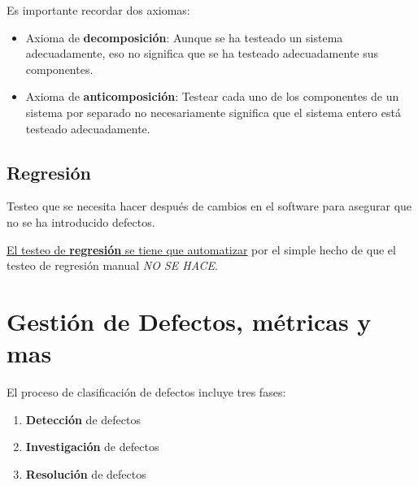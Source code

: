 {Es importante recordar dos axiomas:\ns
\begin{itemize}
	\item Axioma de \textbf{decomposición}: Aunque se ha testeado un sistema adecuadamente, eso no significa que se ha testeado adecuadamente sus componentes.
	\item Axioma de \textbf{anticomposición}: Testear cada uno de los componentes de un sistema por separado no necesariamente significa que el sistema entero está testeado adecuadamente.
\end{itemize} 
}
\subsection{Regresión}
Testeo que se necesita hacer después de cambios en el
software para asegurar que no se ha introducido defectos.

\ul{El testeo de \textbf{regresión} se tiene que automatizar} por el simple hecho de que el testeo de regresión manual \textit{NO SE HACE}.

\section{Gestión de Defectos, métricas y mas}

{El proceso de clasificación de defectos incluye tres fases:\ns
\begin{enumerate}
	\item \textbf{Detección} de defectos
	\item \textbf{Investigación} de defectos
	\item \textbf{Resolución} de defectos
\end{enumerate}}

\vspace{1em}


